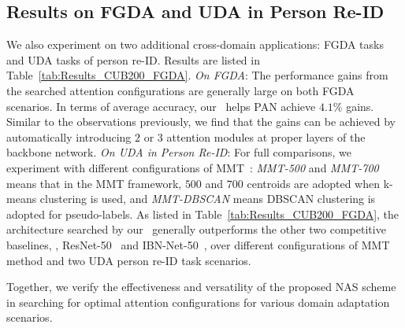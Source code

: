 \documentclass[10pt,twocolumn,letterpaper]{article}
\begin{document}
\subsection{Results on FGDA and UDA in Person Re-ID}
We also experiment on two additional cross-domain applications: FGDA tasks and UDA tasks of person re-ID.
Results are listed in Table~\ref{tab:Results_CUB200_FGDA}.
\textit{On FGDA}:
The performance gains from the searched attention configurations are generally large on both FGDA scenarios. In terms of average accuracy, our \iMethod\, helps PAN achieve $4.1\%$ gains. Similar to the observations previously, we find that the gains can be achieved by automatically introducing $2$ or $3$ attention modules at proper layers of the backbone network. \textit{On UDA in Person Re-ID}:
For full comparisons, we experiment with different configurations of MMT~\cite{ge2020MMT}: \textit{MMT-500} and \textit{MMT-700} means that in the MMT framework, $500$ and $700$ centroids are adopted when k-means clustering is used, and \textit{MMT-DBSCAN} means DBSCAN clustering is adopted for pseudo-labels.
As listed in Table~\ref{tab:Results_CUB200_FGDA}, the architecture searched by our \iMethod\  generally outperforms the other two competitive baselines, \ie, ResNet-50~\cite{he2016resnet} and IBN-Net-50~\cite{pan2018IBNNet}, over different configurations of MMT method and two UDA person re-ID task scenarios.


Together, we verify the effectiveness and versatility of the proposed NAS scheme in searching for optimal attention configurations for various domain adaptation scenarios.
\end{document}
